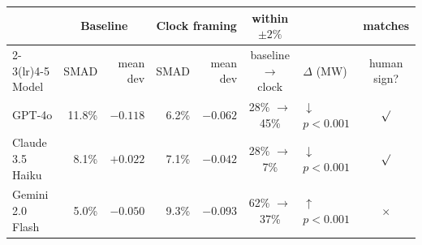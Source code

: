 \begin{tabular}{l rr rr c l c}
\toprule
 & \multicolumn{2}{c}{Baseline} & \multicolumn{2}{c}{Clock framing} & within $\pm2\%$ & & matches \\
\cmidrule(lr){2-3}\cmidrule(lr){4-5}
Model & SMAD & mean dev & SMAD & mean dev & baseline $\to$ clock & $\Delta$ (MW) & human sign? \\
\midrule
GPT-4o & 11.8\% & $-0.118$ & 6.2\% & $-0.062$ & 28\% $\to$ 45\% & $\downarrow$ {\scriptsize $p<0.001$} & $\surd$ \\
Claude 3.5 Haiku & 8.1\% & $+0.022$ & 7.1\% & $-0.042$ & 28\% $\to$ 7\% & $\downarrow$ {\scriptsize $p<0.001$} & $\surd$ \\
Gemini 2.0 Flash & 5.0\% & $-0.050$ & 9.3\% & $-0.093$ & 62\% $\to$ 37\% & $\uparrow$ {\scriptsize $p<0.001$} & $\times$ \\
\bottomrule
\end{tabular}
